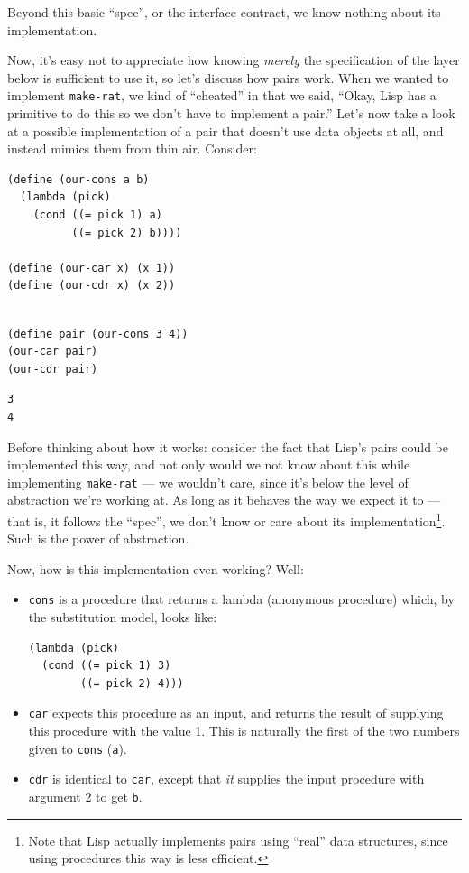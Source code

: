 \documentclass[9pt]{report}
\begin{document}
Beyond this basic ``spec'', or the interface contract, we know
nothing about its implementation.

Now, it's easy not to appreciate how knowing \emph{merely} the
specification of the layer below is sufficient to use it, so let's
discuss how pairs work. When we wanted to implement \texttt{make-rat}, we
kind of ``cheated'' in that we said, ``Okay, Lisp has a primitive to
do this so we don't have to implement a pair.'' Let's now take a
look at a possible implementation of a pair that doesn't use data
objects at all, and instead mimics them from thin air. Consider:

\begin{verbatim}
(define (our-cons a b)
  (lambda (pick)
    (cond ((= pick 1) a)
          ((= pick 2) b))))

(define (our-car x) (x 1))
(define (our-cdr x) (x 2))
\end{verbatim}

\begin{verbatim}

(define pair (our-cons 3 4))
(our-car pair)
(our-cdr pair)
\end{verbatim}

\begin{verbatim}
3
4
\end{verbatim}


Before thinking about how it works: consider the fact that Lisp's
pairs could be implemented this way, and not only would we not know
about this while implementing \texttt{make-rat} --- we wouldn't care,
since it's below the level of abstraction we're working at. As long
as it behaves the way we expect it to --- that is, it follows the
``spec'', we don't know or care about its implementation\footnote{Note that Lisp actually implements pairs using ``real'' data
structures, since using procedures this way is less efficient.}. Such is the
power of abstraction.

Now, how is this implementation even working? Well:
\begin{itemize}
\item \texttt{cons} is a procedure that returns a lambda (anonymous procedure)
which, by the substitution model, looks like:
\begin{verbatim}
(lambda (pick)
  (cond ((= pick 1) 3)
        ((= pick 2) 4)))
\end{verbatim}
\item \texttt{car} expects this procedure as an input, and returns the result of
supplying this procedure with the value 1. This is naturally the
first of the two numbers given to \texttt{cons} (\texttt{a}).
\item \texttt{cdr} is identical to \texttt{car}, except that \emph{it} supplies the input
procedure with argument 2 to get \texttt{b}.
\end{itemize}
\end{document}
